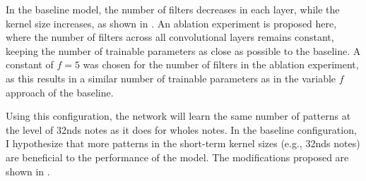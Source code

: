 
In the baseline model, the number of filters decreases in
each layer, while the kernel size increases, as shown in
. An ablation experiment is proposed here,
where the number of filters across all convolutional layers
remains constant, keeping the number of trainable parameters
as close as possible to the baseline. A constant of $f=5$
was chosen for the number of filters in the ablation
experiment, as this results in a similar number of trainable
parameters as in the variable $f$ approach of the baseline.

Using this configuration, the network will learn the same
number of patterns at the level of \glspl{32nd} notes as it
does for \glspl{whole} notes. In the baseline configuration,
I hypothesize that more patterns in the short-term kernel
sizes (e.g., \glspl{32nd} notes) are beneficial to the
performance of the model. The modifications proposed are
shown in .

